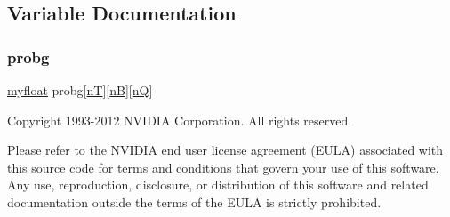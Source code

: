 \subsection{Variable Documentation}
\mbox{\label{memory__copy_8cu_a154b4ee2e5ccbfa05ff4d8df0337f5a3}} 
\subsubsection{\texorpdfstring{probg}{probg}}
{\footnotesize\ttfamily \hyperlink{param_8h_a5f097c9f3873af7be7fc156e6a06ca5e}{myfloat} probg\mbox{[}\hyperlink{NarrowBand_8h_a11e43991170d325cb21737c8e7d5acaa}{nT}\mbox{]}\mbox{[}\hyperlink{NarrowBand_8h_aca13f491975ccaa9a165708a85753bda}{nB}\mbox{]}\mbox{[}\hyperlink{NarrowBand_8h_ac207cb86a4c7e5bc1973837ee2339e59}{nQ}\mbox{]}}

Copyright 1993-\/2012 N\+V\+I\+D\+IA Corporation. All rights reserved.

Please refer to the N\+V\+I\+D\+IA end user license agreement (E\+U\+LA) associated with this source code for terms and conditions that govern your use of this software. Any use, reproduction, disclosure, or distribution of this software and related documentation outside the terms of the E\+U\+LA is strictly prohibited. 